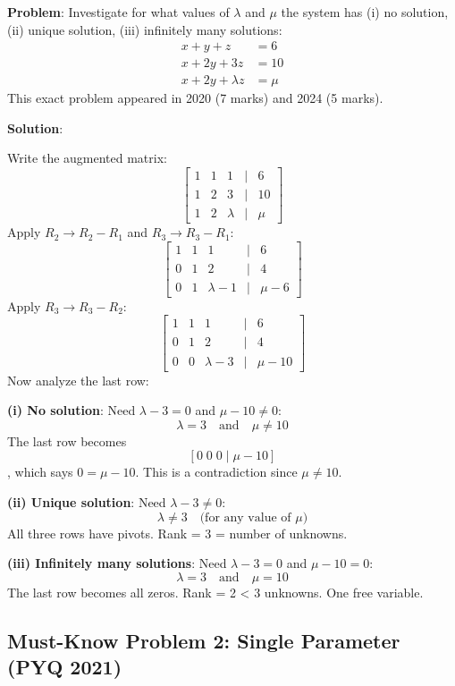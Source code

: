 \documentclass[
]{article}
\begin{document}
\textbf{Problem}: Investigate for what values of \(\lambda\) and \(\mu\)
the system has (i) no solution, (ii) unique solution, (iii) infinitely
many solutions:
\[
\begin{aligned}
x + y + z &= 6 \\
x + 2y + 3z &= 10 \\
x + 2y + \lambda z &= \mu
\end{aligned}
\]
This exact problem appeared in 2020 (7 marks) and 2024 (5 marks).

\textbf{Solution}:

Write the augmented matrix:
\[
\begin{bmatrix}
1 & 1 & 1 & | & 6 \\
1 & 2 & 3 & | & 10 \\
1 & 2 & \lambda & | & \mu
\end{bmatrix}
\]
Apply \(R_2 \to R_2 - R_1\) and \(R_3 \to R_3 - R_1\):
\[
\begin{bmatrix}
1 & 1 & 1 & | & 6 \\
0 & 1 & 2 & | & 4 \\
0 & 1 & \lambda - 1 & | & \mu - 6
\end{bmatrix}
\]
Apply \(R_3 \to R_3 - R_2\):
\[
\begin{bmatrix}
1 & 1 & 1 & | & 6 \\
0 & 1 & 2 & | & 4 \\
0 & 0 & \lambda - 3 & | & \mu - 10
\end{bmatrix}
\]
Now analyze the last row:

\textbf{(i) No solution}: Need \(\lambda - 3 = 0\) and
\(\mu - 10 \neq 0\):
\[
\lambda = 3 \quad \text{and} \quad \mu \neq 10
\]
The last row becomes
\[
[0 \; 0 \; 0 \; \lvert  \; \mu - 10]
\]
, which says \(0 = \mu - 10\). This is a contradiction since
\(\mu \neq 10\).

\textbf{(ii) Unique solution}: Need \(\lambda - 3 \neq 0\):
\[
\lambda \neq 3 \quad \text{(for any value of } \mu\text{)}
\]
All three rows have pivots. Rank = 3 = number of unknowns.

\textbf{(iii) Infinitely many solutions}: Need \(\lambda - 3 = 0\) and
\(\mu - 10 = 0\):
\[
\lambda = 3 \quad \text{and} \quad \mu = 10
\]
The last row becomes all zeros. Rank = 2 \textless{} 3 unknowns. One
free variable.

\subsection{Must-Know Problem 2: Single Parameter (PYQ
2021)}\label{must-know-problem-2-single-parameter-pyq-2021}
\end{document}
